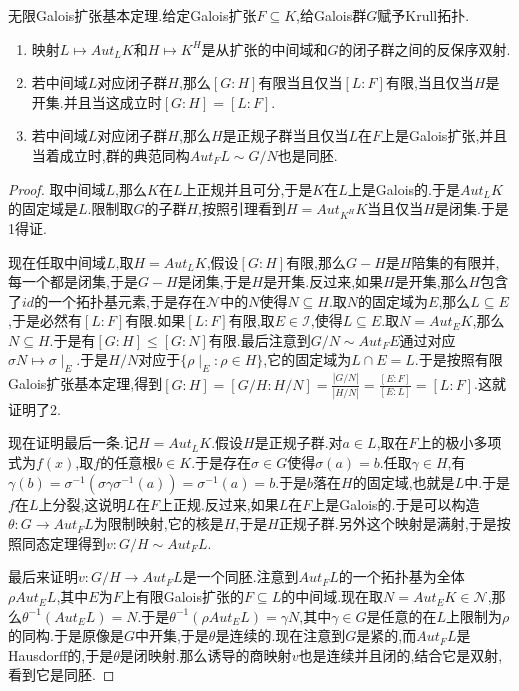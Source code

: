 无限Galois扩张基本定理.给定Galois扩张$F\subseteq K$,给Galois群$G$赋予Krull拓扑.
\begin{enumerate}
	\item 映射$L\mapsto Aut_LK$和$H\mapsto K^H$是从扩张的中间域和$G$的闭子群之间的反保序双射.
	\item 若中间域$L$对应闭子群$H$,那么$[G:H]$有限当且仅当$[L:F]$有限,当且仅当$H$是开集.并且当这成立时$[G:H]=[L:F]$.
	\item 若中间域$L$对应闭子群$H$,那么$H$是正规子群当且仅当$L$在$F$上是Galois扩张,并且当着成立时,群的典范同构$Aut_FL\sim G/N$也是同胚.
\end{enumerate}
\begin{proof}
	
	取中间域$L$,那么$K$在$L$上正规并且可分,于是$K$在$L$上是Galois的.于是$Aut_LK$的固定域是$L$.限制取$G$的子群$H$,按照引理看到$H=Aut_ {K^H}K$当且仅当$H$是闭集.于是1得证.
	
	现在任取中间域$L$,取$H=Aut_LK$,假设$[G:H]$有限,那么$G-H$是$H$陪集的有限并,每一个都是闭集,于是$G-H$是闭集,于是$H$是开集.反过来,如果$H$是开集,那么$H$包含了$id$的一个拓扑基元素,于是存在$\mathscr{N}$中的$N$使得$N\subseteq H$.取$N$的固定域为$E$,那么$L\subseteq E$,于是必然有$[L:F]$有限.如果$[L:F]$有限,取$E\in\mathscr{I}$,使得$L\subseteq E$.取$N=Aut_EK$,那么$N\subseteq H$.于是有$[G:H]\le[G:N]$有限.最后注意到$G/N\sim Aut_FE$通过对应$\sigma N\mapsto\sigma\mid_E$.于是$H/N$对应于$\{\rho\mid_E:\rho\in H\}$,它的固定域为$L\cap E=L$.于是按照有限Galois扩张基本定理,得到$[G:H]= [G/H:H/N]=\frac{|G/N|}{|H/N|}=\frac{[E:F]}{[E:L]}=[L:F]$.这就证明了2.
	
	现在证明最后一条.记$H=Aut_LK$.假设$H$是正规子群.对$a\in L$,取在$F$上的极小多项式为$f(x)$,取$f$的任意根$b\in K$.于是存在$\sigma\in G$使得$\sigma(a)=b$.任取$\gamma\in H$,有$\gamma(b)=\sigma^{-1}(\sigma\gamma\sigma^{-1}(a))=\sigma^{-1}(a)=b$.于是$b$落在$H$的固定域,也就是$L$中.于是$f$在$L$上分裂,这说明$L$在$F$上正规.反过来,如果$L$在$F$上是Galois的.于是可以构造$\theta:G\to Aut_FL$为限制映射,它的核是$H$,于是$H$正规子群.另外这个映射是满射,于是按照同态定理得到$v:G/H\sim Aut_FL$.
	
	最后来证明$v:G/H\to Aut_FL$是一个同胚.注意到$Aut_FL$的一个拓扑基为全体$\rho Aut_EL$,其中$E$为$F$上有限Galois扩张的$F\subseteq L$的中间域.现在取$N=Aut_EK\in\mathscr{N}$,那么$\theta^{-1}(Aut_EL)=N$.于是$\theta^ {-1}(\rho Aut_EL)=\gamma N$,其中$\gamma\in G$是任意的在$L$上限制为$\rho$的同构.于是原像是$G$中开集,于是$\theta$是连续的.现在注意到$G$是紧的,而$Aut_FL$是Hausdorff的,于是$\theta$是闭映射.那么诱导的商映射$v$也是连续并且闭的,结合它是双射,看到它是同胚.
	
\end{proof}

